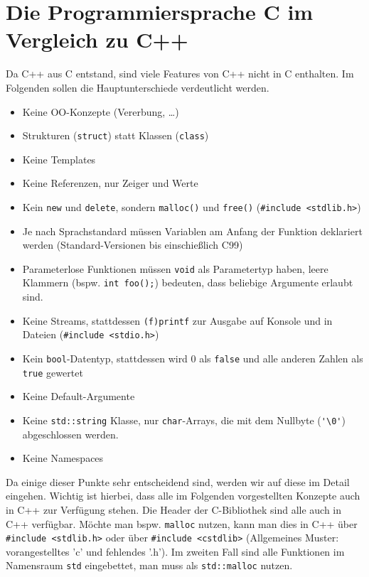 \section{\ExercisePrefixEmbeddedC Die Programmiersprache C im Vergleich zu C++}
\label{sec:CVersusCPlusPlus}

Da C++ aus C entstand, sind viele Features von C++ nicht in C enthalten.
Im Folgenden sollen die Hauptunterschiede verdeutlicht werden.

\begin{itemize}
	\item Keine OO-Konzepte (Vererbung, \dots)
    \item Strukturen (\lstinline{struct}) statt Klassen (\lstinline{class})
	\item Keine Templates
	\item Keine Referenzen, nur Zeiger und Werte
	\item Kein \lstinline{new} und \lstinline{delete}, sondern \lstinline{malloc()} und \lstinline{free()} (\lstinline|#include <stdlib.h>|)
	\item Je nach Sprachstandard müssen Variablen am Anfang der Funktion deklariert werden (Standard-Versionen bis einschießlich C99)
	\item Parameterlose Funktionen müssen \lstinline{void} als Parametertyp haben, leere Klammern (bspw. \lstinline{int foo();}) bedeuten, dass beliebige Argumente erlaubt sind.
	\item Keine Streams, stattdessen \lstinline{(f)printf} zur Ausgabe auf Konsole und in Dateien (\verb|#include <stdio.h>|)
	\item Kein \lstinline{bool}-Datentyp, stattdessen wird 0 als \lstinline{false} und alle anderen Zahlen als \lstinline{true} gewertet
	\item Keine Default-Argumente
	\item Keine \lstinline{std::string} Klasse, nur \lstinline{char}-Arrays, die mit dem Nullbyte (\lstinline{'\0'}) abgeschlossen werden.
	\item Keine Namespaces
\end{itemize}

Da einige dieser Punkte sehr entscheidend sind, werden wir auf diese im Detail eingehen.
Wichtig ist hierbei, dass alle im Folgenden vorgestellten Konzepte auch in C++ zur Verfügung stehen.
Die Header der C-Bibliothek sind alle auch in C++ verfügbar.
Möchte man bspw. \lstinline{malloc} nutzen, kann man dies in C++ über \lstinline|#include <stdlib.h>| oder über \lstinline{#include <cstdlib>} (Allgemeines Muster: vorangestelltes 'c' und fehlendes '.h').
Im zweiten Fall sind alle Funktionen im Namensraum \lstinline{std} eingebettet, man muss als \lstinline{std::malloc} nutzen.

